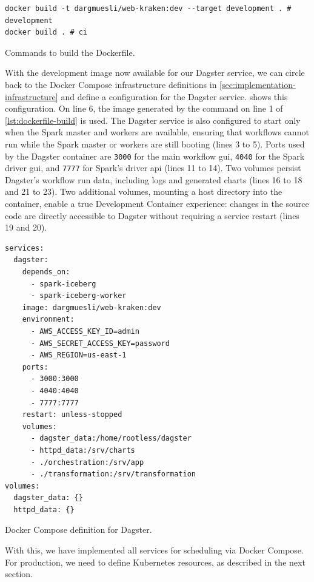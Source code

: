 \begin{listing}[H]
\begin{verbatim}
docker build -t dargmuesli/web-kraken:dev --target development . # development
docker build . # ci
\end{verbatim}
\caption{Commands to build the Dockerfile.}
\label{lst:dockerfile-build}
\end{listing}

With the development image now available for our Dagster service, we can circle back to the Docker Compose infrastructure definitions in \cref{sec:implementation-infrastructure} and define a configuration for the Dagster service.
 shows this configuration.
On line 6, the image generated by the command on line 1 of \cref{lst:dockerfile-build} is used.
The Dagster service is also configured to start only when the Spark master and workers are available, ensuring that workflows cannot run while the Spark master or workers are still booting (lines 3 to 5).
Ports used by the Dagster container are \texttt{3000} for the main workflow \ac{gui}, \texttt{4040} for the Spark driver \ac{gui}, and \texttt{7777} for Spark's driver \ac{api} (lines 11 to 14).
Two volumes persist Dagster's workflow run data, including logs and generated charts (lines 16 to 18 and 21 to 23).
Two additional volumes, mounting a host directory into the container, enable a true Development Container experience: changes in the source code are directly accessible to Dagster without requiring a service restart (lines 19 and 20).

\begin{listing}[H]
\begin{verbatim}
services:
  dagster:
    depends_on:
      - spark-iceberg
      - spark-iceberg-worker
    image: dargmuesli/web-kraken:dev
    environment:
      - AWS_ACCESS_KEY_ID=admin
      - AWS_SECRET_ACCESS_KEY=password
      - AWS_REGION=us-east-1
    ports:
      - 3000:3000
      - 4040:4040
      - 7777:7777
    restart: unless-stopped
    volumes:
      - dagster_data:/home/rootless/dagster
      - httpd_data:/srv/charts
      - ./orchestration:/srv/app
      - ./transformation:/srv/transformation
volumes:
  dagster_data: {}
  httpd_data: {}
\end{verbatim}
\caption{Docker Compose definition for Dagster.}
\label{lst:compose-dagster}
\end{listing}

With this, we have implemented all services for scheduling via Docker Compose.
For production, we need to define Kubernetes resources, as described in the next section.


